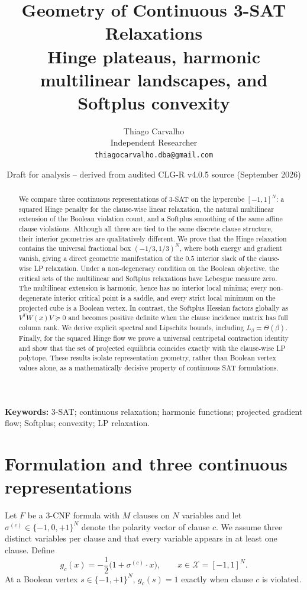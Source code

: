 \documentclass[11pt,a4paper]{article}
\title{Geometry of Continuous 3-SAT Relaxations\\\large Hinge plateaus, harmonic multilinear landscapes, and Softplus convexity}
\author{Thiago Carvalho\\Independent Researcher\\\texttt{thiagocarvalho.dba@gmail.com}}
\date{Draft for analysis -- derived from audited CLG-R v4.0.5 source (September 2026)}
\newcommand{\X}{\mathcal X}
\begin{document}
\maketitle
\begin{abstract}
We compare three continuous representations of 3-SAT on the hypercube $[-1,1]^N$: a squared Hinge penalty for the clause-wise linear relaxation, the natural multilinear extension of the Boolean violation count, and a Softplus smoothing of the same affine clause violations. Although all three are tied to the same discrete clause structure, their interior geometries are qualitatively different. We prove that the Hinge relaxation contains the universal fractional box $(-1/3,1/3)^N$, where both energy and gradient vanish, giving a direct geometric manifestation of the $0.5$ interior slack of the clause-wise LP relaxation. Under a non-degeneracy condition on the Boolean objective, the critical sets of the multilinear and Softplus relaxations have Lebesgue measure zero. The multilinear extension is harmonic, hence has no interior local minima; every non-degenerate interior critical point is a saddle, and every strict local minimum on the projected cube is a Boolean vertex. In contrast, the Softplus Hessian factors globally as $V^TW(x)V\succeq0$ and becomes positive definite when the clause incidence matrix has full column rank. We derive explicit spectral and Lipschitz bounds, including $L_\beta=\Theta(\beta)$. Finally, for the squared Hinge flow we prove a universal centripetal contraction identity and show that the set of projected equilibria coincides exactly with the clause-wise LP polytope. These results isolate representation geometry, rather than Boolean vertex values alone, as a mathematically decisive property of continuous SAT formulations.
\end{abstract}
\noindent\textbf{Keywords:} 3-SAT; continuous relaxation; harmonic functions; projected gradient flow; Softplus; convexity; LP relaxation.

\section{Formulation and three continuous representations}
Let $F$ be a 3-CNF formula with $M$ clauses on $N$ variables and let $\sigma^{(c)}\in\{-1,0,+1\}^N$ denote the polarity vector of clause $c$. We assume three distinct variables per clause and that every variable appears in at least one clause. Define
\begin{equation}
g_c(x)=-\frac12\bigl(1+\sigma^{(c)}\cdot x\bigr),\qquad x\in\X=[-1,1]^N.
\end{equation}
At a Boolean vertex $s\in\{-1,+1\}^N$, $g_c(s)=1$ exactly when clause $c$ is violated.
\end{document}
